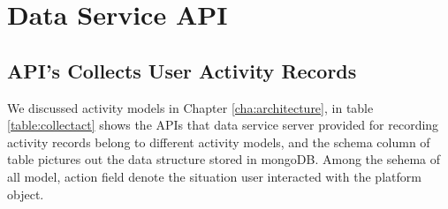 \section{Data Service API}
\subsection{API's Collects User Activity Records}
We discussed activity models in Chapter \ref{cha:architecture}, in table \ref{table:collectact} shows the APIs that data service server provided for recording activity records belong to different activity models, and the schema column of table pictures out the data structure stored in mongoDB.
Among the sehema of all model, action field denote the situation user interacted with the platform object.

